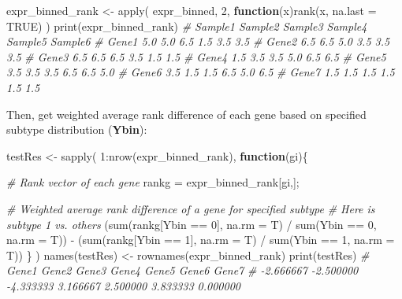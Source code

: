 \documentclass[
  12pt,
]{book}
\newenvironment{Shaded}{\begin{snugshade}}{\end{snugshade}}
\newcommand{\AttributeTok}[1]{\textcolor[rgb]{0.77,0.63,0.00}{#1}}
\newcommand{\CommentTok}[1]{\textcolor[rgb]{0.56,0.35,0.01}{\textit{#1}}}
\newcommand{\ConstantTok}[1]{\textcolor[rgb]{0.00,0.00,0.00}{#1}}
\newcommand{\ControlFlowTok}[1]{\textcolor[rgb]{0.13,0.29,0.53}{\textbf{#1}}}
\newcommand{\DecValTok}[1]{\textcolor[rgb]{0.00,0.00,0.81}{#1}}
\newcommand{\FunctionTok}[1]{\textcolor[rgb]{0.00,0.00,0.00}{#1}}
\newcommand{\NormalTok}[1]{#1}
\newcommand{\OtherTok}[1]{\textcolor[rgb]{0.56,0.35,0.01}{#1}}
\newcommand{\SpecialCharTok}[1]{\textcolor[rgb]{0.00,0.00,0.00}{#1}}
\begin{document}
\begin{Shaded}
\begin{Highlighting}[]
\NormalTok{expr\_binned\_rank }\OtherTok{\textless{}{-}} \FunctionTok{apply}\NormalTok{(}
\NormalTok{  expr\_binned, }\DecValTok{2}\NormalTok{, }
  \ControlFlowTok{function}\NormalTok{(x)}\FunctionTok{rank}\NormalTok{(x, }\AttributeTok{na.last =} \ConstantTok{TRUE}\NormalTok{)}
\NormalTok{)}
\FunctionTok{print}\NormalTok{(expr\_binned\_rank)}
\CommentTok{\#       Sample1 Sample2 Sample3 Sample4 Sample5 Sample6}
\CommentTok{\# Gene1     5.0     5.0     6.5     1.5     3.5     3.5}
\CommentTok{\# Gene2     6.5     6.5     5.0     3.5     3.5     3.5}
\CommentTok{\# Gene3     6.5     6.5     6.5     3.5     1.5     1.5}
\CommentTok{\# Gene4     1.5     3.5     3.5     5.0     6.5     6.5}
\CommentTok{\# Gene5     3.5     3.5     3.5     6.5     6.5     5.0}
\CommentTok{\# Gene6     3.5     1.5     1.5     6.5     5.0     6.5}
\CommentTok{\# Gene7     1.5     1.5     1.5     1.5     1.5     1.5}
\end{Highlighting}
\end{Shaded}

Then, get weighted average rank difference of each gene based on specified subtype distribution (\textbf{Ybin}):

\begin{Shaded}
\begin{Highlighting}[]
\NormalTok{testRes }\OtherTok{\textless{}{-}} \FunctionTok{sapply}\NormalTok{(}
  \DecValTok{1}\SpecialCharTok{:}\FunctionTok{nrow}\NormalTok{(expr\_binned\_rank), }
  \ControlFlowTok{function}\NormalTok{(gi)\{}
    
    \CommentTok{\# Rank vector of each gene}
\NormalTok{    rankg }\OtherTok{=}\NormalTok{ expr\_binned\_rank[gi,];}
    
    \CommentTok{\# Weighted average rank difference of a gene for specified subtype }
    \CommentTok{\# Here is subtype 1 vs. others}
\NormalTok{    (}\FunctionTok{sum}\NormalTok{(rankg[Ybin }\SpecialCharTok{==} \DecValTok{0}\NormalTok{], }\AttributeTok{na.rm =}\NormalTok{ T) }\SpecialCharTok{/} \FunctionTok{sum}\NormalTok{(Ybin }\SpecialCharTok{==} \DecValTok{0}\NormalTok{, }\AttributeTok{na.rm =}\NormalTok{ T)) }\SpecialCharTok{{-}} 
\NormalTok{    (}\FunctionTok{sum}\NormalTok{(rankg[Ybin }\SpecialCharTok{==} \DecValTok{1}\NormalTok{], }\AttributeTok{na.rm =}\NormalTok{ T) }\SpecialCharTok{/} \FunctionTok{sum}\NormalTok{(Ybin }\SpecialCharTok{==} \DecValTok{1}\NormalTok{, }\AttributeTok{na.rm =}\NormalTok{ T))}
\NormalTok{  \}}
\NormalTok{)}
\FunctionTok{names}\NormalTok{(testRes) }\OtherTok{\textless{}{-}} \FunctionTok{rownames}\NormalTok{(expr\_binned\_rank)}
\FunctionTok{print}\NormalTok{(testRes)}
\CommentTok{\#     Gene1     Gene2     Gene3     Gene4     Gene5     Gene6     Gene7 }
\CommentTok{\# {-}2.666667 {-}2.500000 {-}4.333333  3.166667  2.500000  3.833333  0.000000}
\end{Highlighting}
\end{Shaded}
\end{document}
